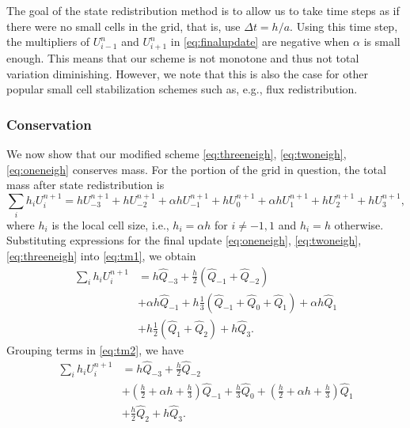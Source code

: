 The goal of the state redistribution method is to allow us to take time steps as if there were no small cells in the grid, that is, use $\Delta t = h / a$.  Using this time step, the multipliers of $U^n_{i-1}$ and $U^n_{i+1}$ in \eqref{eq:finalupdate} are negative when $\alpha$ is small enough.  This means that our scheme is not monotone and thus not total variation diminishing.  However, we note that this is also the case for other popular small cell stabilization schemes such as, e.g., flux redistribution.

\subsubsection*{Conservation}
We now show that our modified scheme \eqref{eq:threeneigh}, \eqref{eq:twoneigh}, \eqref{eq:oneneigh} conserves mass.
For the portion of the grid in question, the total mass after state redistribution is
\begin{equation}\label{eq:tm1}
	\sum_{i} h_i U^{n+1}_i  = h U^{n+1}_{-3} + h U^{n+1}_{-2} + \alpha h U^{n+1}_{-1} +h U^{n+1}_0+\alpha h U^{n+1}_{1} + h U^{n+1}_{2} + h U^{n+1}_{3},
\end{equation}
where $h_i$ is the local cell size, i.e., $h_i = \alpha h$ for $i \neq -1,1$ and $h_i = h$ otherwise.
Substituting expressions for the final update \eqref{eq:oneneigh}, \eqref{eq:twoneigh}, \eqref{eq:threeneigh} into \eqref{eq:tm1}, we obtain
\begin{equation}\label{eq:tm2}
\begin{aligned}
\sum_{i} h_i U^{n+1}_i  &= h \widehat{Q}_{-3} + \frac{h}{2}(\widehat{Q}_{-1}+\widehat{Q}_{-2}) \\
&+ \alpha h \widehat{Q}_{-1} +h \frac{1}{3}(\widehat{Q}_{-1}+\widehat{Q}_{0}+\widehat{Q}_{1})+\alpha h \widehat{Q}_{1} \\
&+ h \frac{1}{2}(\widehat{Q}_{1}+\widehat{Q}_{2}) + h \widehat{Q}_{3}.
\end{aligned}
\end{equation}
Grouping terms in \eqref{eq:tm2}, we have
\begin{equation}\label{eq:tm3}
\begin{aligned}
\sum_{i} h_i U^{n+1}_i  &= h \widehat{Q}_{-3} + \frac{h}{2}\widehat{Q}_{-2} \\
&+ \left(\frac{h}{2}+\alpha h + \frac{h}{3}\right) \widehat{Q}_{-1} + \frac{h}{3} \widehat{Q}_0 + \left(\frac{h}{2}+\alpha h + \frac{h}{3}\right) \widehat{Q}_{1} \\
&+ \frac{h}{2}\widehat{Q}_{2} + h \widehat{Q}_3.
\end{aligned}
\end{equation}
